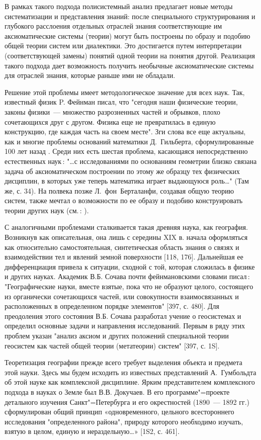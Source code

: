 \documentclass[14pt,draft,openany]{extbook}
\begin{document}
В рамках такого подхода полисистемный анализ предлагает новые методы систематизации и представления знаний: после специального структурирования и глубокого расслоения отдельных отраслей знания соответствующие им аксиоматические системы (теории) могут быть построены по образу и подобию общей теории систем или диалектики. Это достигается путем интерпретации (соответствующей замены) понятий одной теории на понятия другой. Реализация такого подхода дает возможность получить необычные аксиоматические системы для отраслей знания, которые раньше ими не обладали.

Решение этой проблемы имеет методологическое значение для всех наук. Так, известный физик P. Фейнман \cite{b437} писал, что "сегодня наши физические теории, законы физики~--- множество разрозненных частей и обрывков, плохо сочетающихся друг с другом.  Физика еще не превратилась в единую конструкцию, где каждая часть на своем месте". Зги слова все еще актуальны, как и многие проблемы оснований математики Д.~Гильберта, сформулированные 100 лет назад \cite{b347}. Среди них есть шестая проблема, касающаяся непосредственно естественных наук\,: "\ldots{}с исследованиями по основаниям геометрии близко связана задача об аксиоматическом построении по этому же образцу тех физических дисциплин, в которых уже теперь математика играет выдающуюся роль\ldots{}" (Там же, с. 34). На полвека позже Л.~фон~Берталанфи, создавая общую теорию систем, также мечтал о возможности по ее образу и подобию конструировать теории других наук (см.\,: \cite{b367}).

С аналогичными проблемами сталкивается такая древняя наука, как география. Возникнув как описательная, она лишь с середины XIX в. начала оформляться как относительно самостоятельная, синтетическая область знания о связях и взаимодействии тел и явлений земной поверхности [118, 176]. Дальнейшая ее дифференциация привела к ситуации, сходной с той, которая сложилась в физике и других науках. Академик В.Б. Сочава почти фейнмановскими словами писал\,: "Географические науки, вместе взятые, пока что не образуют целого, состоящего из органически сочетающихся частей, или совокупности взаимосвязанных и расположенных в определенном порядке элементов" [397, с. 480]. Для преодоления этого состояния В.Б. Сочава разработал учение о геосистемах и определил основные задачи и направления исследований. Первым в ряду этих проблем указан "анализ аксиом и других положений специальной теории геосистем как частей общей теории (метатеории) систем" [397, с. 1S].

Теоретизация географии прежде всего требует выделения объекта и предмета этой науки. Здесь мы будем исходить из известных представлений А.~Гумбольдта об этой науке как комплексной дисциплине. Ярким представителем комплексного подхода в науках о Земле был В.В. Докучаев. В его программе"=проекте детального изучения Санкт"=Петербурга и его окрестностей (1890~--- 1892 гг.) сформулирован общий принцип «одновременного, цельного всестороннего исследования "определенного района", природу которого необходимо изучать, взятую в целом, единую и нераздельную\ldots{}» [1S2, с. 461].
\end{document}
